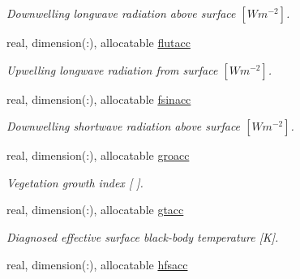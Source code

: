 \begin{DoxyCompactItemize}
\begin{DoxyCompactList}\small\item\em Downwelling longwave radiation above surface $[W m^{-2} ]$. \end{DoxyCompactList}\item 
\hypertarget{structclass__statevars_1_1class__rotated_a8d156a4d663c42ad39d2a2cf22e71423}{}real, dimension(\+:), allocatable \hyperlink{structclass__statevars_1_1class__rotated_a8d156a4d663c42ad39d2a2cf22e71423}{flutacc}\label{structclass__statevars_1_1class__rotated_a8d156a4d663c42ad39d2a2cf22e71423}

\begin{DoxyCompactList}\small\item\em Upwelling longwave radiation from surface $[W m^{-2} ]$. \end{DoxyCompactList}\item 
\hypertarget{structclass__statevars_1_1class__rotated_a2af3c1af5ba3b6b62beaca3f9efe9ad1}{}real, dimension(\+:), allocatable \hyperlink{structclass__statevars_1_1class__rotated_a2af3c1af5ba3b6b62beaca3f9efe9ad1}{fsinacc}\label{structclass__statevars_1_1class__rotated_a2af3c1af5ba3b6b62beaca3f9efe9ad1}

\begin{DoxyCompactList}\small\item\em Downwelling shortwave radiation above surface $[W m^{-2} ]$. \end{DoxyCompactList}\item 
\hypertarget{structclass__statevars_1_1class__rotated_a383e6087c6fef1dddf7b52fe286ada23}{}real, dimension(\+:), allocatable \hyperlink{structclass__statevars_1_1class__rotated_a383e6087c6fef1dddf7b52fe286ada23}{groacc}\label{structclass__statevars_1_1class__rotated_a383e6087c6fef1dddf7b52fe286ada23}

\begin{DoxyCompactList}\small\item\em Vegetation growth index \mbox{[} \mbox{]}. \end{DoxyCompactList}\item 
\hypertarget{structclass__statevars_1_1class__rotated_a6ad35fc1942bf9aac8daf7ac2a4b3f7f}{}real, dimension(\+:), allocatable \hyperlink{structclass__statevars_1_1class__rotated_a6ad35fc1942bf9aac8daf7ac2a4b3f7f}{gtacc}\label{structclass__statevars_1_1class__rotated_a6ad35fc1942bf9aac8daf7ac2a4b3f7f}

\begin{DoxyCompactList}\small\item\em Diagnosed effective surface black-\/body temperature \mbox{[}K\mbox{]}. \end{DoxyCompactList}\item 
\hypertarget{structclass__statevars_1_1class__rotated_a72757a337ad1a4e66a970755502eb1c6}{}real, dimension(\+:), allocatable \hyperlink{structclass__statevars_1_1class__rotated_a72757a337ad1a4e66a970755502eb1c6}{hfsacc}\label{structclass__statevars_1_1class__rotated_a72757a337ad1a4e66a970755502eb1c6}


\end{DoxyCompactItemize}

